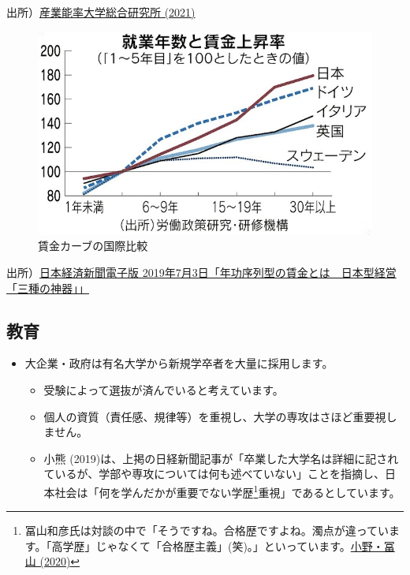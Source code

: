 \documentclass[
]{book}
\begin{document}
出所）\href{https://www.hj.sanno.ac.jp/cp/feature/201912/24-01.html}{産業能率大学総合研究所 (2021)}

\begin{figure}
\includegraphics[width=960px]{wages} \caption{賃金カーブの国際比較}\label{fig:wages}
\end{figure}

出所）\href{https://www.nikkei.com/article/DGXKZO46883220S9A700C1EA2000/}{日本経済新聞電子版 2019年7月3日「年功序列型の賃金とは　日本型経営「三種の神器」」}

\hypertarget{japan-education}{%
\subsection{教育}\label{japan-education}}

\begin{itemize}
\item
  大企業・政府は有名大学から新規学卒者を大量に採用します。

  \begin{itemize}
  \item
    受験によって選抜が済んでいると考えています。
  \item
    個人の資質（責任感、規律等）を重視し、大学の専攻はさほど重要視しません。
  \item
    小熊 (2019)は、上掲の日経新聞記事が「卒業した大学名は詳細に記されているが、学部や専攻については何も述べていない」ことを指摘し、日本社会は「何を学んだかが重要でない学歴\footnote{冨山和彦氏は対談の中で「そうですね。合格歴ですよね。濁点が違っています。「高学歴」じゃなくて「合格歴主義」(笑)。」といっています。\href{https://gendai.ismedia.jp/articles/-/71570?page=5}{小野・冨山 (2020)}}重視」であるとしています。
  \end{itemize}
\end{itemize}
\end{document}
